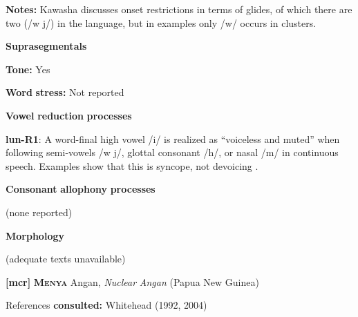 \documentclass[output=paper]{langsci/langscibook}
\begin{document}
\begin{styleBody}
\textbf{Notes:} Kawasha discusses onset restrictions in terms of glides, of which there are two (/w j/) in the language, but in examples only /w/ occurs in clusters.
\end{styleBody}

\begin{styleBody}
\textbf{Suprasegmentals}
\end{styleBody}

\begin{styleBody}
\textbf{Tone:} Yes
\end{styleBody}

\begin{styleBody}
\textbf{Word} \textbf{stress:} Not reported
\end{styleBody}

\begin{styleBody}
\textbf{Vowel} \textbf{reduction} \textbf{processes}
\end{styleBody}

\begin{styleBody}
\textbf{lun-R1}: A word-final high vowel /i/ is realized as “voiceless and muted” when following semi-vowels /w j/, glottal consonant /h/, or nasal /m/ in continuous speech. Examples show that this is syncope, not devoicing \citep[37-8]{Kawasha2003}.
\end{styleBody}

\begin{styleBody}
\textbf{Consonant} \textbf{allophony} \textbf{processes}
\end{styleBody}

\begin{styleBody}
(none reported)
\end{styleBody}

\begin{styleBody}
\textbf{Morphology}
\end{styleBody}

\begin{styleBody}
(adequate texts unavailable)
\end{styleBody}

\begin{styleBody}
\textbf{[mcr]}   \textbf{\textsc{Menya}}    Angan, \textit{Nuclear} \textit{Angan} (Papua New Guinea)
\end{styleBody}

\begin{styleBody}
References \textbf{consulted:} Whitehead (1992, 2004)
\end{styleBody}
\end{document}
